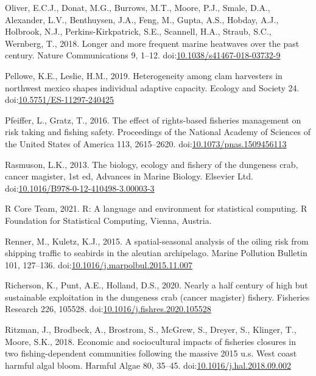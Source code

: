 \documentclass[]{elsarticle} %
\begin{document}
\leavevmode\hypertarget{ref-Oliver2018}{}%
Oliver, E.C.J., Donat, M.G., Burrows, M.T., Moore, P.J., Smale, D.A.,
Alexander, L.V., Benthuysen, J.A., Feng, M., Gupta, A.S., Hobday, A.J.,
Holbrook, N.J., Perkins-Kirkpatrick, S.E., Scannell, H.A., Straub, S.C.,
Wernberg, T., 2018. Longer and more frequent marine heatwaves over the
past century. Nature Communications 9, 1--12.
doi:\href{https://doi.org/10.1038/s41467-018-03732-9}{10.1038/s41467-018-03732-9}

\leavevmode\hypertarget{ref-Pellowe2019}{}%
Pellowe, K.E., Leslie, H.M., 2019. Heterogeneity among clam harvesters
in northwest mexico shapes individual adaptive capacity. Ecology and
Society 24.
doi:\href{https://doi.org/10.5751/ES-11297-240425}{10.5751/ES-11297-240425}

\leavevmode\hypertarget{ref-Pfeiffer2016}{}%
Pfeiffer, L., Gratz, T., 2016. The effect of rights-based fisheries
management on risk taking and fishing safety. Proceedings of the
National Academy of Sciences of the United States of America 113,
2615--2620.
doi:\href{https://doi.org/10.1073/pnas.1509456113}{10.1073/pnas.1509456113}

\leavevmode\hypertarget{ref-Rasmuson2013}{}%
Rasmuson, L.K., 2013. The biology, ecology and fishery of the dungeness
crab, cancer magister, 1st ed, Advances in Marine Biology. Elsevier Ltd.
doi:\href{https://doi.org/10.1016/B978-0-12-410498-3.00003-3}{10.1016/B978-0-12-410498-3.00003-3}

\leavevmode\hypertarget{ref-RCoreTeam2021}{}%
R Core Team, 2021. R: A language and environment for statistical
computing. R Foundation for Statistical Computing, Vienna, Austria.

\leavevmode\hypertarget{ref-Renner2015}{}%
Renner, M., Kuletz, K.J., 2015. A spatial-seasonal analysis of the
oiling risk from shipping traffic to seabirds in the aleutian
archipelago. Marine Pollution Bulletin 101, 127--136.
doi:\href{https://doi.org/10.1016/j.marpolbul.2015.11.007}{10.1016/j.marpolbul.2015.11.007}

\leavevmode\hypertarget{ref-Richerson2020}{}%
Richerson, K., Punt, A.E., Holland, D.S., 2020. Nearly a half century of
high but sustainable exploitation in the dungeness crab (cancer
magister) fishery. Fisheries Research 226, 105528.
doi:\href{https://doi.org/10.1016/j.fishres.2020.105528}{10.1016/j.fishres.2020.105528}

\leavevmode\hypertarget{ref-Ritzman2018}{}%
Ritzman, J., Brodbeck, A., Brostrom, S., McGrew, S., Dreyer, S.,
Klinger, T., Moore, S.K., 2018. Economic and sociocultural impacts of
fisheries closures in two fishing-dependent communities following the
massive 2015 u.s. West coast harmful algal bloom. Harmful Algae 80,
35--45.
doi:\href{https://doi.org/10.1016/j.hal.2018.09.002}{10.1016/j.hal.2018.09.002}
\end{document}
